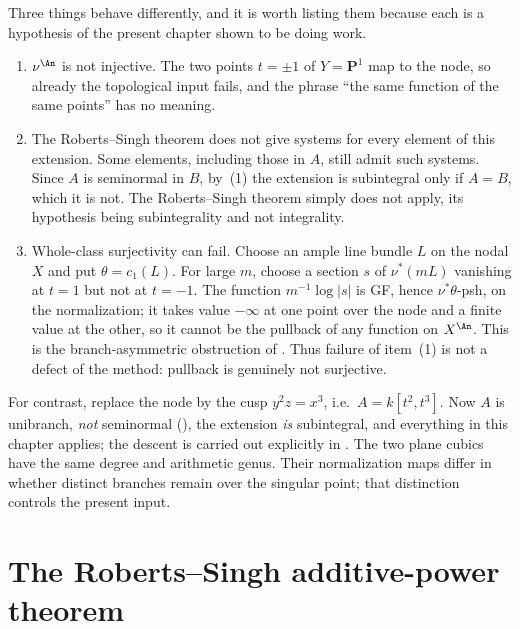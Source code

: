 \begin{example}
Three things behave differently, and it is worth listing them because each
is a hypothesis of the present chapter shown to be doing work.
\begin{enumerate}
\item $\nu^{\An}$ is not injective.  The two points $t=\pm1$ of
      $Y=\mathbf P^1$ map to the node, so already the topological input
       fails, and the phrase
      ``the same function of the same points'' has no meaning.
\item The Roberts--Singh theorem does not give systems for every element
      of this extension.  Some elements, including those in $A$, still
      admit such systems.  Since $A$ is seminormal in $B$, by
      \,(1) the extension is
      subintegral only if $A=B$, which it is not.  The Roberts--Singh
      theorem simply does not apply, its hypothesis being subintegrality
      and not integrality.
\item Whole-class surjectivity can fail.  Choose an ample line bundle
      $L$ on the nodal $X$ and put $\theta=c_1(L)$.  For large $m$,
      choose a section $s$ of $\nu^*(mL)$ vanishing at $t=1$ but
      not at $t=-1$.  The function $m^{-1}\log|s|$ is GF, hence
      $\nu^*\theta$-psh, on the normalization; it takes value
      $-\infty$ at one point over the node and a finite value at the
      other, so it cannot be the pullback of any function on $X^{\An}$.
      This is the branch-asymmetric obstruction of
      .  Thus failure of item~(1) is not a defect of
      the method: pullback is genuinely not surjective.
\end{enumerate}
For contrast, replace the node by the cusp $y^2z=x^3$, i.e.\
$A=k[t^2,t^3]$.  Now $A$ is unibranch, \emph{not} seminormal
(), the extension \emph{is}
subintegral, and everything in this chapter applies; the descent is carried
out explicitly in \Cref{ex:ch44-cusp-end-to-end}.  The two plane cubics have the same degree and arithmetic genus.
Their normalization maps differ in whether distinct branches remain
over the singular point; that distinction controls the present input.
\end{example}

\section{The Roberts--Singh additive-power theorem}
\label{sec:ch44-roberts-singh}

